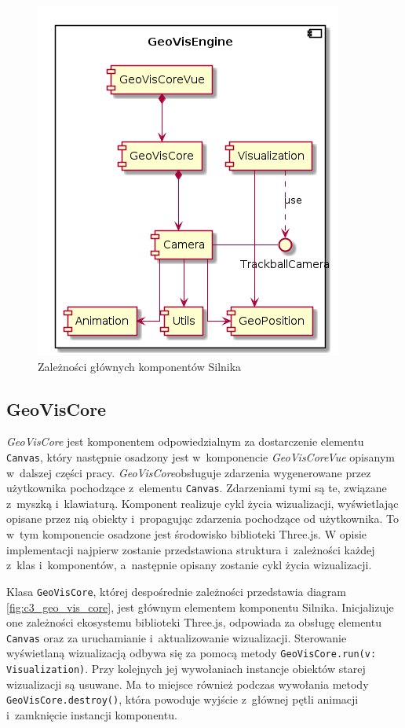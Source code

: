 \begin{figure}
    \centering 
    \includegraphics[scale=0.6]{diagrams/out/c3_geo_vis_engine.png}
    \caption{Zależności głównych komponentów Silnika}
    \label{fig:c3_geo_vis_engine}
\end{figure}

\subsection{GeoVisCore}

\textit{GeoVisCore} jest komponentem odpowiedzialnym za dostarczenie elementu \texttt{Canvas}, który następnie osadzony jest w~komponencie \textit{GeoVisCoreVue} opisanym w~dalszej części pracy. \mbox{\textit{GeoVisCore}}obsługuje zdarzenia wygenerowane przez użytkownika pochodzące z~elementu \texttt{Canvas}. Zdarzeniami tymi są te, związane z~myszką i~klawiaturą. Komponent realizuje cykl życia wizualizacji, wyświetlając opisane przez nią obiekty i~propagując zdarzenia pochodzące od użytkownika. To w~tym komponencie osadzone jest środowisko biblioteki Three.js.
W opisie implementacji najpierw zostanie przedstawiona struktura i~zależności każdej z~klas i~komponentów, a~następnie opisany zostanie cykl życia wizualizacji.

Klasa \texttt{GeoVisCore}, której despośrednie zależności przedstawia diagram \ref{fig:c3_geo_vis_core}, jest głównym elementem komponentu Silnika. Inicjalizuje one zależności ekosystemu biblioteki Three.js, odpowiada za obsługę elementu \texttt{Canvas} oraz za uruchamianie i~aktualizowanie wizualizacji. Sterowanie wyświetlaną wizualizacją odbywa się za pomocą metody \mbox{\texttt{GeoVisCore.run(v: Visualization)}}. Przy kolejnych jej wywołaniach instancje obiektów starej wizualizacji są usuwane. Ma to miejsce również podczas wywołania metody \mbox{\texttt{GeoVisCore.destroy()}}, która powoduje wyjście z~głównej pętli animacji i~zamknięcie instancji komponentu.

